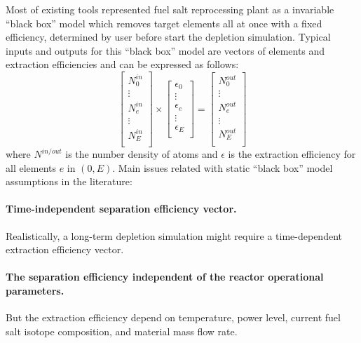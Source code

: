 Most of existing tools represented fuel salt reprocessing plant as a 
invariable ``black box'' model which removes target elements all at once with 
a fixed efficiency, determined by user before start the depletion simulation. 
Typical inputs and outputs for this ``black box'' model are vectors of 
elements and extraction efficiencies and can be expressed as follows:
\begin{equation}
\begin{bmatrix}
N^{in}_{0} \\ \vdots \\ N^{in}_{e} \\ \vdots \\ N^{in}_{E} \\
\end{bmatrix} 
\times
\begin{bmatrix}
\epsilon_{0} \\ \vdots \\ \epsilon_{e} \\ \vdots \\ \epsilon_{E} \\
\end{bmatrix} =
\begin{bmatrix}
N^{out}_{0}\\ \vdots \\ N^{out}_{e} \\ \vdots \\N^{out}_{E}  \\
\end{bmatrix}
\end{equation}
where $N^{in/out}$ is the number density of atoms and $\epsilon$ is the 
extraction efficiency for all elements $e$ in $(0, E)$. Main issues related 
with static ``black box'' model assumptions in the literature: 
\paragraph{Time-independent separation efficiency vector.} Realistically,   
	a long-term depletion simulation might require a time-dependent extraction 
	efficiency vector.
\paragraph{The separation efficiency independent of the reactor operational 
	parameters.} But the extraction efficiency depend on temperature, power 
	level, current fuel salt isotope composition, and material mass flow rate.
